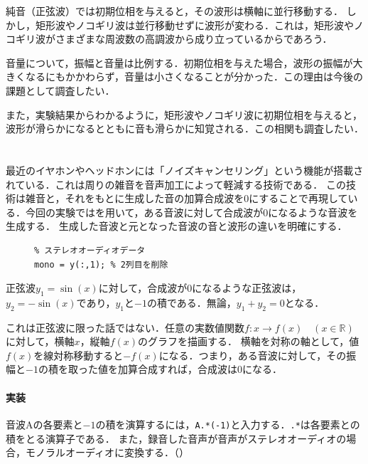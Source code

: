 \consideration
純音（正弦波）では初期位相を与えると，その波形は横軸に並行移動する．
しかし，矩形波やノコギリ波は並行移動せずに波形が変わる．これは，矩形波やノコギリ波がさまざまな周波数の高調波から成り立っているからであろう．\par
音量について，振幅と音量は比例する．初期位相を与えた場合，波形の振幅が大きくなるにもかかわらず，音量は小さくなることが分かった．この理由は今後の課題として調査したい．\par
また，実験結果からわかるように，矩形波やノコギリ波に初期位相を与えると，波形が滑らかになるとともに音も滑らかに知覚される．この相関も調査したい．
\section{\kadaicb}\label{sec:\kadaicb}
\purpose
最近のイヤホンやヘッドホンには「ノイズキャンセリング」という機能が搭載されている．これは周りの雑音を音声加工によって軽減する技術である．
この技術は雑音と，それをもとに生成した音の加算合成波を\(0\)にすることで再現している．今回の実験では\matlab を用いて，ある音波に対して合成波が\(0\)になるような音波を生成する．
生成した音波と元となった音波の音と波形の違いを明確にする．
\method
\begin{figure}
    \vspace{-1cm}
    \centering
    \begin{lstlisting}[caption={モノラルへの変換},label={src:モノラルへの変換},numbers={none}]
% y : N行2列
% ステレオオーディオデータ
mono = y(:,1); % 2列目を削除
    \end{lstlisting}
    \vspace{-1cm}
\end{figure}
正弦波\(y_1=\sin(x)\)に対して，合成波が\(0\)になるような正弦波は，\(y_2=-\sin(x)\)であり，\(y_1\)と\(-1\)の積である．無論，\(y_1+y_2=0\)となる．\par
これは正弦波に限った話ではない．任意の実数値関数\(f:x\longrightarrow f(x)\quad(x\in\mathbb{R})\)に対して，横軸\(x\)，縦軸\(f(x)\)のグラフを描画する．
横軸を対称の軸として，値\(f(x)\)を線対称移動すると\(-f(x)\)になる．つまり，ある音波に対して，その振幅と\(-1\)の積を取った値を加算合成すれば，合成波は\(0\)になる．
\paragraph{実装}
音波Aの各要素と\(-1\)の積を演算するには，\texttt{A.*(-1)}と入力する．\texttt{.*}は各要素との積をとる演算子である．
また，録音した音声が音声がステレオオーディオの場合，モノラルオーディオに変換する．（）
